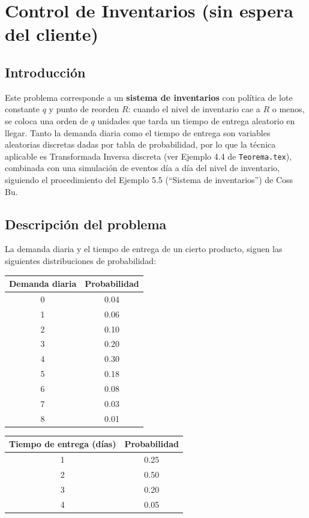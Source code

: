 \section{Control de Inventarios (sin espera del cliente)}

\subsection{Introducción}

Este problema corresponde a un \textbf{sistema de inventarios} con política de lote constante $q$ y punto de reorden $R$: cuando el nivel de inventario cae a $R$ o menos, se coloca una orden de $q$ unidades que tarda un tiempo de entrega aleatorio en llegar. Tanto la demanda diaria como el tiempo de entrega son variables aleatorias discretas dadas por tabla de probabilidad, por lo que la técnica aplicable es Transformada Inversa discreta (ver Ejemplo 4.4 de \texttt{Teorema.tex}), combinada con una simulación de eventos día a día del nivel de inventario, siguiendo el procedimiento del Ejemplo 5.5 (``Sistema de inventarios'') de Coss Bu.

\subsection{Descripción del problema}

La demanda diaria y el tiempo de entrega de un cierto producto, siguen las siguientes distribuciones de probabilidad:

\begin{center}
\begin{tabular}{cc}
\toprule
Demanda diaria & Probabilidad \\
\midrule
0 & 0.04 \\
1 & 0.06 \\
2 & 0.10 \\
3 & 0.20 \\
4 & 0.30 \\
5 & 0.18 \\
6 & 0.08 \\
7 & 0.03 \\
8 & 0.01 \\
\bottomrule
\end{tabular}
\qquad
\begin{tabular}{cc}
\toprule
Tiempo de entrega (días) & Probabilidad \\
\midrule
1 & 0.25 \\
2 & 0.50 \\
3 & 0.20 \\
4 & 0.05 \\
\bottomrule
\end{tabular}
\end{center}

